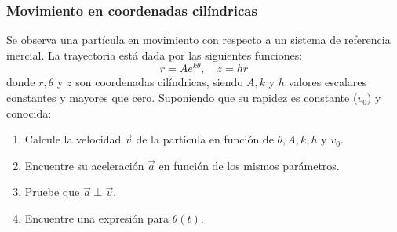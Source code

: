 \subsubsection{Movimiento en coordenadas cilíndricas}

Se observa una partícula en movimiento con respecto a un sistema de referencia inercial. La trayectoria está dada por las siguientes funciones:
\[ r = Ae^{k\theta}, \quad z = hr \]
donde $r, \theta$ y $z$ son coordenadas cilíndricas, siendo $A, k$ y $h$ valores escalares constantes y mayores que cero. Suponiendo que su rapidez es constante ($v_0$) y conocida:

\begin{enumerate}
    \item Calcule la velocidad $\vec{v}$ de la partícula en función de $\theta, A, k, h$ y $v_0$.
    \item Encuentre su aceleración $\vec{a}$ en función de los mismos parámetros.
    \item Pruebe que $\vec{a} \perp \vec{v}$.
    \item Encuentre una expresión para $\theta(t)$.
\end{enumerate}

